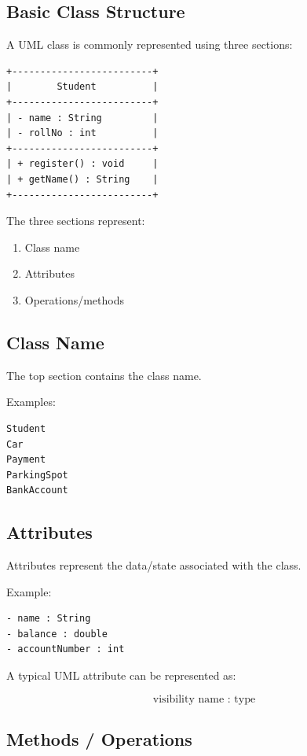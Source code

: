 \documentclass[11pt,a4paper]{article}
\begin{document}
\subsection{Basic Class Structure}

A UML class is commonly represented using three sections:

\begin{verbatim}
+-------------------------+
|        Student          |
+-------------------------+
| - name : String         |
| - rollNo : int          |
+-------------------------+
| + register() : void     |
| + getName() : String    |
+-------------------------+
\end{verbatim}

The three sections represent:

\begin{enumerate}
    \item Class name
    \item Attributes
    \item Operations/methods
\end{enumerate}

\subsection{Class Name}

The top section contains the class name.

Examples:

\begin{verbatim}
Student
Car
Payment
ParkingSpot
BankAccount
\end{verbatim}

\subsection{Attributes}

Attributes represent the data/state associated with the class.

Example:

\begin{verbatim}
- name : String
- balance : double
- accountNumber : int
\end{verbatim}

A typical UML attribute can be represented as:

\[
\text{visibility name : type}
\]

\subsection{Methods / Operations}
\end{document}
